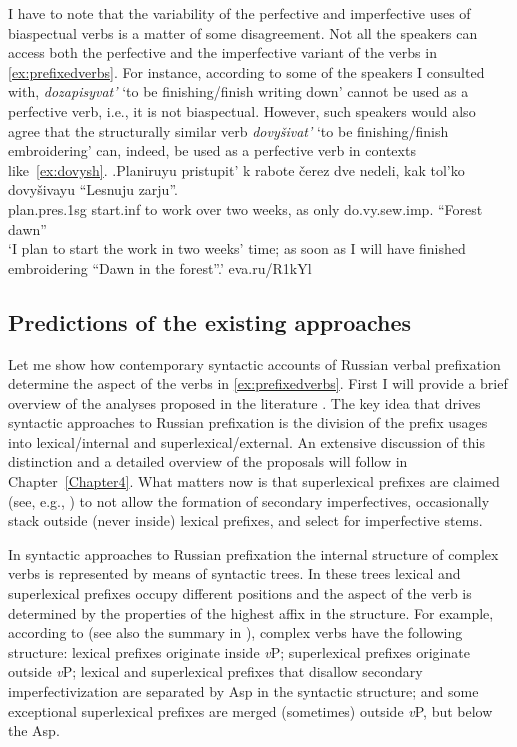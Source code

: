I have to note that the variability of the perfective and imperfective uses of biaspectual verbs is a matter of some disagreement. Not all the speakers can access both the perfective and the imperfective variant of the verbs in \ref{ex:prefixedverbs}. For instance, according to some of the speakers I consulted with, \textit{dozapisyvat'} `to be finishing/finish writing down' cannot be used as a perfective verb, i.e., it is not biaspectual. However, such speakers would also agree that the structurally similar verb \textit{dovy\v{s}ivat'} `to be finishing/finish embroidering' can, indeed, be used as a perfective verb in contexts like~\ref{ex:dovysh}.
\exg.\label{ex:dovysh}Planiruyu pristupit' k rabote \v{c}erez dve nedeli, kak tol'ko dovy\v{s}ivayu ``Lesnuju zarju''.\\
plan.pres.1sg start.inf to work over two weeks, as only do.vy.sew.imp. ``Forest dawn''\\
\trans `I plan to start the work in two weeks' time; as soon as I will have finished embroidering ``Dawn in the forest''.'
\hfill eva.ru/R1kYl

\subsection{Predictions of the existing approaches}\label{subsection:bi:predictions}
Let me show how contemporary syntactic accounts of Russian verbal prefixation determine the aspect of the verbs in \ref{ex:prefixedverbs}. First I will provide a brief overview of the analyses proposed in the literature \citep{Ramchand:04, Svenonius:04a, Svenonius:04b, Romanova:06, Tatevosov:07, Tatevosov:09}. The key idea that drives syntactic approaches to Russian prefixation is the division of the prefix usages into lexical/internal and superlexical/external. An extensive discussion of this distinction and a detailed overview of the proposals will follow in Chapter~\ref{Chapter4}. What matters now is that superlexical prefixes are claimed (see, e.g., \citealt[229]{Svenonius:04b}) to not allow the formation of secondary imperfectives, occasionally stack outside (never inside) lexical prefixes, and select for imperfective stems.

In syntactic approaches to Russian prefixation the internal structure of complex verbs is represented by means of syntactic trees. In these trees lexical and superlexical prefixes occupy different positions and the aspect of the verb is determined by the properties of the highest affix in the structure. For example, according to \citealt{Svenonius:04b} (see also the summary in \citealt{Svenonius:12}), complex verbs have the following structure: lexical prefixes originate inside \textit{v}P; superlexical prefixes originate outside \textit{v}P; lexical and superlexical prefixes that disallow secondary imperfectivization are separated by Asp in the syntactic structure; and some exceptional superlexical prefixes are merged (sometimes) outside \textit{v}P, but below the Asp.

